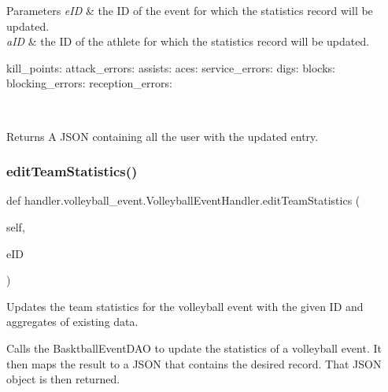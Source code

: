 \begin{DoxyParams}{Parameters}
{\em e\+ID} & the ID of the event for which the statistics record will be updated. \\
\hline
{\em a\+ID} & the ID of the athlete for which the statistics record will be updated. \begin{DoxyVerb}           kill_points:
           attack_errors:
           assists:
           aces:
           service_errors:
           digs:
           blocks:
           blocking_errors:
           reception_errors:
\end{DoxyVerb}
\\
\hline
\end{DoxyParams}
\begin{DoxyReturn}{Returns}
A J\+S\+ON containing all the user with the updated entry. 
\end{DoxyReturn}
\mbox{\label{classhandler_1_1volleyball__event_1_1_volleyball_event_handler_a8808ffe14fac6db3f9dbd22962085dd8}} 
\subsubsection{\texorpdfstring{edit\+Team\+Statistics()}{editTeamStatistics()}}
{\footnotesize\ttfamily def handler.\+volleyball\+\_\+event.\+Volleyball\+Event\+Handler.\+edit\+Team\+Statistics (\begin{DoxyParamCaption}\item[{}]{self,  }\item[{}]{e\+ID }\end{DoxyParamCaption})}



Updates the team statistics for the volleyball event with the given ID and aggregates of existing data. 

Calls the Basktball\+Event\+D\+AO to update the statistics of a volleyball event. It then maps the result to a J\+S\+ON that contains the desired record. That J\+S\+ON object is then returned.


